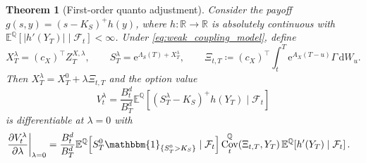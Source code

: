 \documentclass[10pt,a4paper,reqno]{amsart}
\newtheorem{theorem}{Theorem}[section]
\newcommand{\R}{\mathbb{R}}
\newcommand{\E}{\mathbb{E}}
\newcommand{\Q}{\mathbb{Q}}
\newcommand{\F}{\mathcal{F}}
\newcommand{\1}{\mathbbm{1}}
\newcommand{\dd}{\mathrm{d}}
\newcommand{\ee}{\mathrm{e}}
\DeclareMathOperator{\Cov}{Cov}
\begin{document}
\begin{theorem}[First-order quanto adjustment]
\label{thm:weak_coupling}
Consider the payoff \(g(s,y)=(s-K_S)^+h(y)\), where
\(h:\R\to\R\) is absolutely continuous with
\(\E^\Q[|h'(Y_T)| \mid \F_t] < \infty\). Under
\eqref{eq:weak_coupling_model}, define
\[
X_T^\lambda = (c_X)^\top Z_T^{X,\lambda},\qquad
S_T^\lambda = \ee^{\Lambda_S(T)+X_T^\lambda},
\qquad
\Xi_{t,T} \coloneqq (c_X)^\top \int_t^T \ee^{A_X(T-u)} \Gamma\,\dd W_u.
\]
Then \(X_T^\lambda = X_T^0 + \lambda \Xi_{t,T}\) and the option value
\[
V_t^\lambda
= \frac{B_t^d}{B_T^d}\E^\Q\!\left[(S_T^\lambda-K_S)^+h(Y_T)\mid\F_t\right]
\]
is differentiable at \(\lambda=0\) with
\begin{align}
  \left.\frac{\partial V_t^\lambda}{\partial \lambda}\right|_{\lambda=0}
  &= \frac{B_t^d}{B_T^d}
     \E^\Q\!\left[S_T^0 \1_{\{S_T^0>K_S\}}\mid\F_t\right]
     \Cov_t^\Q(\Xi_{t,T},Y_T)\,
     \E^\Q\!\left[h'(Y_T)\mid\F_t\right].
     \label{eq:weak_coupling_price_adjustment}
\end{align}
\end{theorem}
\end{document}
